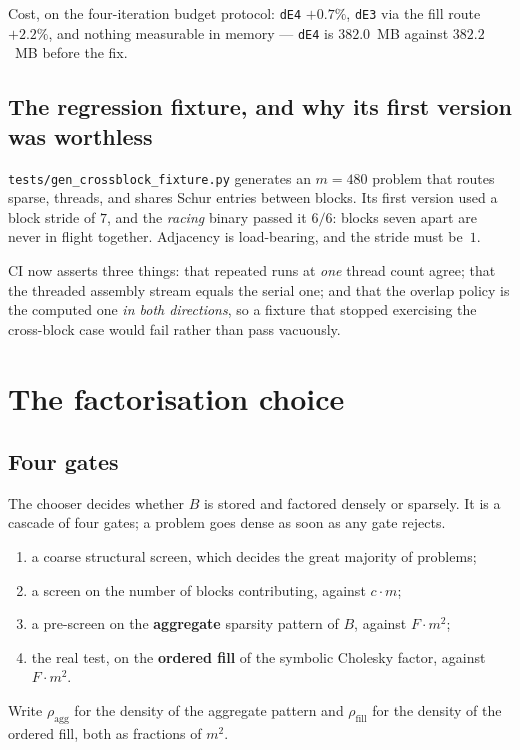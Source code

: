 \documentclass[11pt]{article}
\newcommand{\aggr}{\rho_{\mathrm{agg}}}
\newcommand{\rfill}{\rho_{\mathrm{fill}}}
\newcommand{\bMat}{B}
\newcommand{\code}[1]{\texttt{#1}}
\begin{document}
Cost, on the four-iteration budget protocol: \code{dE4} $+0.7\%$, \code{dE3} via the fill route
$+2.2\%$, and nothing measurable in memory --- \code{dE4} is $382.0$~MB against $382.2$~MB before
the fix.

\subsection{The regression fixture, and why its first version was worthless}

\code{tests/gen\_crossblock\_fixture.py} generates an $m{=}480$ problem that routes sparse, threads,
and shares Schur entries between blocks. Its first version used a block stride of $7$, and the
\emph{racing} binary passed it $6/6$: blocks seven apart are never in flight together. Adjacency is
load-bearing, and the stride must be~$1$.

CI now asserts three things: that repeated runs at \emph{one} thread count agree; that the threaded
assembly stream equals the serial one; and that the overlap policy is the computed one \emph{in
both directions}, so a fixture that stopped exercising the cross-block case would fail rather than
pass vacuously.

\section{The factorisation choice}

\subsection{Four gates}

The chooser decides whether $\bMat$ is stored and factored densely or sparsely. It is a cascade of
four gates; a problem goes dense as soon as any gate rejects.

\begin{enumerate}
\item a coarse structural screen, which decides the great majority of problems;
\item a screen on the number of blocks contributing, against $c \cdot m$;
\item a pre-screen on the \textbf{aggregate} sparsity pattern of $\bMat$, against $F \cdot m^2$;
\item the real test, on the \textbf{ordered fill} of the symbolic Cholesky factor, against
      $F \cdot m^2$.
\end{enumerate}

Write $\aggr$ for the density of the aggregate pattern and $\rfill$ for the density of the ordered
fill, both as fractions of $m^2$.
\end{document}
